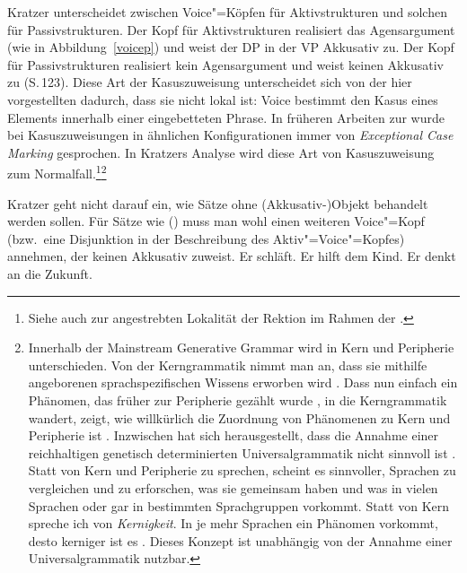 {Kratzer unterscheidet
zwischen Voice"=Köpfen für Aktivstrukturen und solchen für Passivstrukturen. Der Kopf
für Aktivstrukturen realisiert das Agensargument (wie in Abbildung~\ref{voicep}) und
weist der DP in der VP Akkusativ zu. Der Kopf für Passivstrukturen realisiert
kein Agensargument und weist keinen Akkusativ zu (S.\,123). Diese Art der Kasuszuweisung
unterscheidet sich von der hier vorgestellten dadurch, dass sie nicht lokal ist: Voice
bestimmt den Kasus eines Elements innerhalb einer eingebetteten Phrase. In früheren
Arbeiten zur \gb wurde bei Kasuszuweisungen in ähnlichen Konfigurationen immer von
\emph{Exceptional Case Marking} gesprochen. In Kratzers Analyse wird diese Art von
Kasuszuweisung zum Normalfall.\footnote{
  Siehe auch  zur angestrebten Lokalität der Rektion im Rahmen der \gbt.
}\footnote{%
Innerhalb der Mainstream Generative Grammar wird in Kern und Peripherie unterschieden. Von der
Kerngrammatik nimmt man an, dass sie mithilfe angeborenen sprachspezifischen Wissens erworben wird
\citep[7--8]{Chomsky81a}. Dass nun einfach ein Phänomen, das früher zur Peripherie gezählt wurde
\parencites[70]{Chomsky81a}[13, 48]{Hyams88a-u}, in die Kerngrammatik wandert, zeigt, wie
willkürlich die Zuordnung von Phänomenen zu Kern und Peripherie ist
\citep{MuellerKernigkeit}. Inzwischen hat sich herausgestellt, dass die Annahme einer reichhaltigen
genetisch determinierten Universalgrammatik nicht sinnvoll ist \citep[Kapitel~13]{MuellerGT-Eng5}. Statt von
Kern und Peripherie zu sprechen, scheint es sinnvoller, Sprachen zu vergleichen und zu erforschen,
was sie gemeinsam haben und was in vielen Sprachen oder gar in bestimmten Sprachgruppen
vorkommt. Statt von Kern spreche ich von \emph{Kernigkeit}. In je mehr Sprachen ein Phänomen vorkommt,
desto kerniger ist es \citep{MuellerKernigkeit}. Dieses Konzept ist unabhängig von der Annahme einer
Universalgrammatik nutzbar.}
\largerpage

Kratzer geht nicht darauf ein, wie Sätze ohne (Akkusativ-)Objekt behandelt werden sollen. Für
Sätze wie () muss man wohl einen weiteren Voice"=Kopf (bzw.\ eine Disjunktion
in der Beschreibung des Aktiv"=Voice"=Kopfes) annehmen, der keinen Akkusativ zuweist.
\eal
\ex Er schläft.
\ex Er hilft dem Kind.
\ex Er denkt an die Zukunft.
\zl

}
